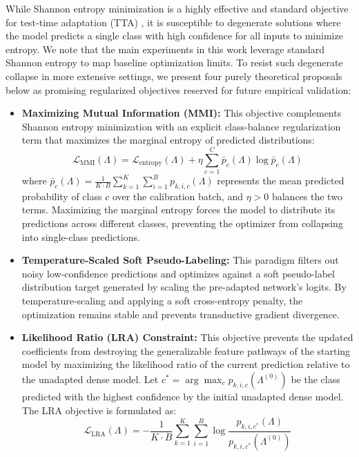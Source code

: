 While Shannon entropy minimization is a highly effective and standard objective for test-time adaptation (TTA) \cite{wang2020tent}, it is susceptible to degenerate solutions where the model predicts a single class with high confidence for all inputs to minimize entropy. We note that the main experiments in this work leverage standard Shannon entropy to map baseline optimization limits. To resist such degenerate collapse in more extensive settings, we present four purely theoretical proposals below as promising regularized objectives reserved for future empirical validation:
\begin{itemize}[leftmargin=*]
    \item \textbf{Maximizing Mutual Information (MMI):} This objective complements Shannon entropy minimization with an explicit class-balance regularization term that maximizes the marginal entropy of predicted distributions:
    \begin{equation}
        \mathcal{L}_{\text{MMI}}(\Lambda) = \mathcal{L}_{\text{entropy}}(\Lambda) + \eta \sum_{c=1}^C \bar{p}_c(\Lambda) \log \bar{p}_c(\Lambda)
    \end{equation}
    where $\bar{p}_c(\Lambda) = \frac{1}{K \cdot B} \sum_{k=1}^K \sum_{i=1}^B p_{k,i,c}(\Lambda)$ represents the mean predicted probability of class $c$ over the calibration batch, and $\eta > 0$ balances the two terms. Maximizing the marginal entropy forces the model to distribute its predictions across different classes, preventing the optimizer from collapsing into single-class predictions.
    \item \textbf{Temperature-Scaled Soft Pseudo-Labeling:} This paradigm filters out noisy low-confidence predictions and optimizes against a soft pseudo-label distribution target generated by scaling the pre-adapted network's logits. By temperature-scaling and applying a soft cross-entropy penalty, the optimization remains stable and prevents transductive gradient divergence.
    \item \textbf{Likelihood Ratio (LRA) Constraint:} This objective prevents the updated coefficients from destroying the generalizable feature pathways of the starting model by maximizing the likelihood ratio of the current prediction relative to the unadapted dense model. Let $c^* = \arg\max_c p_{k,i,c}(\Lambda^{(0)})$ be the class predicted with the highest confidence by the initial unadapted dense model. The LRA objective is formulated as:
    \begin{equation}
        \mathcal{L}_{\text{LRA}}(\Lambda) = -\frac{1}{K \cdot B} \sum_{k=1}^K \sum_{i=1}^B \log \frac{p_{k, i, c^*}(\Lambda)}{p_{k, i, c^*}(\Lambda^{(0)})}

\end{equation}
\end{itemize}
